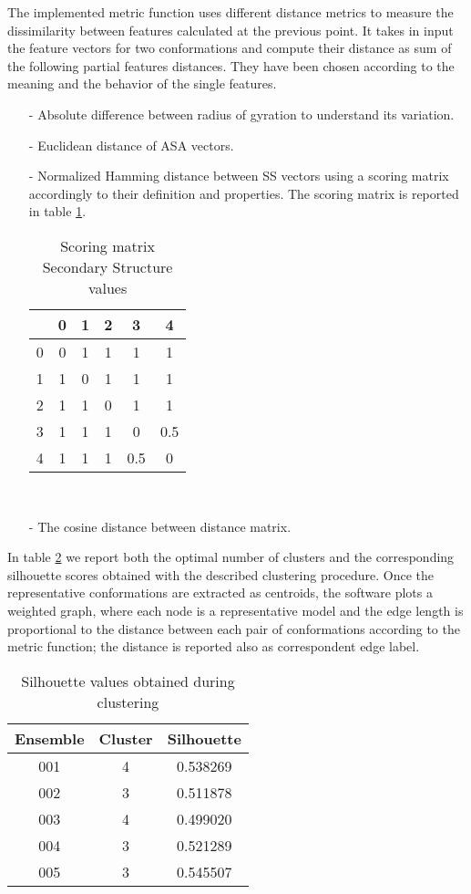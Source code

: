 \medskip
The implemented metric function uses different distance metrics to measure the dissimilarity between features calculated at the previous point. It takes in input the feature vectors for two conformations and compute their distance as sum of the following partial features distances. They have been chosen according to the meaning and the behavior of the single features.
\begin{itemize}
\item[-] Absolute difference between radius of gyration to understand its variation.
\item[-] Euclidean distance of ASA vectors.
\item[-] Normalized Hamming distance between SS vectors using a scoring matrix accordingly to their definition and properties. The scoring matrix is reported in table \ref{tab:score}. 

\begin{table}[H]
\begin{center}
\begin{tabular}{c|ccccc}
& 0 & 1 & 2 & 3 & 4 \\
\hline
0 & 0 & 1 & 1 & 1 & 1\\
1 & 1 & 0 & 1 & 1 & 1\\
2 & 1 & 1 & 0 & 1 & 1\\
3 & 1 & 1 & 1 & 0 & 0.5\\
4 & 1 & 1 & 1 & 0.5 & 0\\
\end{tabular}
\end{center}
\caption{Scoring matrix Secondary Structure values}~\label{tab:score}
\end{table}

\item[-] The cosine distance between distance matrix. 
\end{itemize}

In table \ref{tab:silhouette} we report both the optimal number of clusters and the corresponding silhouette scores obtained with the described clustering procedure. 
Once the representative conformations are extracted as centroids, the software plots a weighted graph, where each node is a representative model and the edge length is proportional to the distance between each pair of conformations according to the metric function; the distance is reported also as correspondent edge label.

\begin{table}[H]
\begin{center}
\begin{tabular}{ccc}
\textbf{Ensemble} & \textbf{Cluster} & \textbf{Silhouette}\\
\hline
001 & 4 & 0.538269\\
\hline
002 & 3 & 0.511878\\
\hline
003 & 4 & 0.499020\\
\hline
004 & 3 & 0.521289\\
\hline
005 & 3 & 0.545507\\
\end{tabular}
\end{center}
\caption{Silhouette values obtained during clustering}~\label{tab:silhouette}
\end{table}

